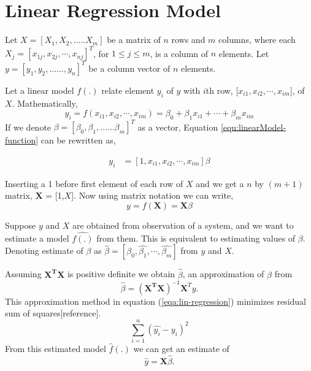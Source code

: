 \documentclass[10pt,a4paper]{article}
\begin{document}
	
	\section{Linear Regression Model}
	Let $X = [X_1,X_2,.....X_m]$  be a matrix of $n$ rows and $m$ columns, where each $X_j=[x_{1j},x_{2j}, \cdots, x_{nj}]^T$, for $1\le j\le m$, is a column of $n$ elements. Let $y = [y_1,y_2,......,y_n]^T$ be a column vector of $n$ elements.
	
	Let a linear model $f(.)$ relate  element $y_i$ of $y$ with $i$th row, [$x_{i1}, x_{i2},\cdots , x_{im}$], of $X$. Mathematically,
	\begin{equation}
	y_i =  f(x_{i1},x_{i2},\cdots, x_{im}) =\beta_0+\beta_1 x_{i1}+\cdots +\beta_m x_{im} 
	\label{equ:linearModel-function}
	\end{equation}
	If we denote $ \beta =[\beta_0,\beta_1,......\beta_m]^T$ as a vector, Equation \ref{equ:linearModel-function} can be rewritten as,
  
	\begin{align}
	       y_i &=[1,x_{i1},x_{i2},\cdots,x_{im}]\beta 
	\end{align}
	 
	  
	Inserting a 1 before first element of each row of $X$ and we get a $n$ by $(m+1)$ matrix, $\boldsymbol{X}$ = [1,$X$]. Now using matrix notation we can write,
	\begin{equation}
		\label{equ:function-with-beta}
	y = f(\boldsymbol{X}) = \boldsymbol{X}\beta
	\end{equation}
	
	Suppose $y$ and $X$ are obtained from observation of a system, and we want to estimate a model $\hat{f(.)}$ from them. This is equivalent to estimating values of $\beta$. Denoting estimate of $\beta$ as $\hat{\beta} = [\hat{\beta_0}, \hat{\beta_1}, \cdots,\hat{\beta_m}]$ from $y$ and $X$. 
	\par
	Assuming $\boldsymbol{X^TX}$ is positive definite we obtain $\hat{\beta}$, an approximation of $\beta$ from 
	\begin{equation}
	\label{equ:lin-regression}
	\hat{\beta} = (\boldsymbol{X^TX})^{-1}\boldsymbol{X}^Ty.
	\end{equation}
	This approximation method in equation (\ref{eqa:lin-regression}) minimizes residual sum of squares[reference]. 
	\begin{equation*}
	\sum_{i=1}^{n}(\hat{y_i}-y_i)^2
	\end{equation*}
	From this estimated model $\hat{f}(.)$ we can get an estimate of 
	\begin{equation}
	\label{equ:estimated-y}
	\hat{y} = \boldsymbol{X}\hat{\beta}.
	\end{equation}
	
\end{document}
